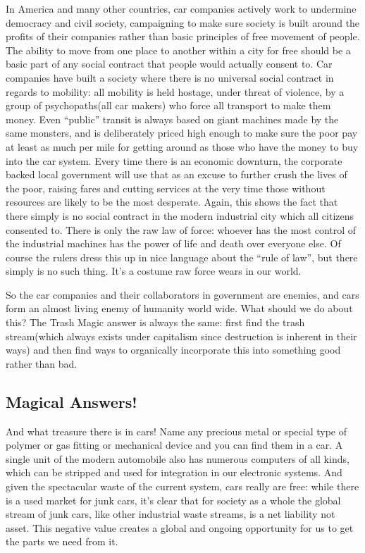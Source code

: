 In America and many other countries, car companies actively work to
undermine democracy and civil society, campaigning to make sure society
is built around the profits of their companies rather than basic
principles of free movement of people. The ability to move from one
place to another within a city for free should be a basic part of any
social contract that people would actually consent to. Car companies
have built a society where there is no universal social contract in
regards to mobility: all mobility is held hostage, under threat of
violence, by a group of psychopaths(all car makers) who force all
transport to make them money. Even ``public'' transit is always based on
giant machines made by the same monsters, and is deliberately priced
high enough to make sure the poor pay at least as much per mile for
getting around as those who have the money to buy into the car system.
Every time there is an economic downturn, the corporate backed local
government will use that as an excuse to further crush the lives of the
poor, raising fares and cutting services at the very time those without
resources are likely to be the most desperate. Again, this shows the
fact that there simply is no social contract in the modern industrial
city which all citizens consented to. There is only the raw law of
force: whoever has the most control of the industrial machines has the
power of life and death over everyone else. Of course the rulers dress
this up in nice language about the ``rule of law'', but there simply is
no such thing. It's a costume raw force wears in our world.

So the car companies and their collaborators in government are enemies,
and cars form an almost living enemy of humanity world wide. What should
we do about this? The Trash Magic answer is always the same: first find
the trash stream(which always exists under capitalism since destruction
is inherent in their ways) and then find ways to organically incorporate
this into something good rather than bad.

\subsection{Magical Answers!}\label{magical-answers}

And what treasure there is in cars! Name any precious metal or special
type of polymer or gas fitting or mechanical device and you can find
them in a car. A single unit of the modern automobile also has numerous
computers of all kinds, which can be stripped and used for integration
in our electronic systems. And given the spectacular waste of the
current system, cars really are free: while there is a used market for
junk cars, it's clear that for society as a whole the global stream of
junk cars, like other industrial waste streams, is a net liability not
asset. This negative value creates a global and ongoing opportunity for
us to get the parts we need from it.

